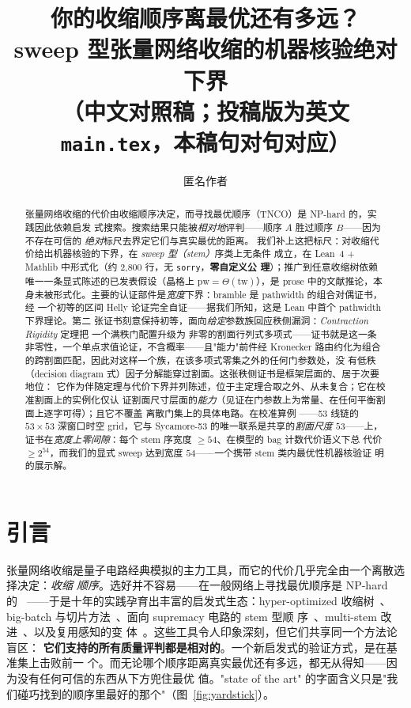 \documentclass[11pt]{ctexart}
\title{你的收缩顺序离最优还有多远？\\
       \large sweep 型张量网络收缩的机器核验绝对下界\\[2pt]
       \normalsize （中文对照稿；投稿版为英文 \texttt{main.tex}，本稿句对句对应）}
\author{匿名作者}
\date{}
\newcommand{\pw}{\mathrm{pw}}
\newcommand{\tw}{\mathrm{tw}}
\begin{document}
\maketitle

\begin{abstract}
张量网络收缩的代价由收缩顺序决定，而寻找最优顺序（TNCO）是 NP-hard 的，实践因此依赖启发
式搜索。搜索结果只能被\emph{相对地}评判——顺序 $A$ 胜过顺序 $B$——因为不存在可信的
\emph{绝对}标尺去界定它们与真实最优的距离。
我们补上这把标尺：对收缩代价给出机器核验的下界，在 \emph{sweep 型（stem）}序类上无条件
成立，在 Lean~4 + Mathlib 中形式化（约 2{,}800 行，无 \texttt{sorry}，\textbf{零自定义公
理}）；推广到任意收缩树依赖唯一一条显式陈述的已发表假设（晶格上 $\pw=\Theta(\tw)$），是
prose 中的文献推论，本身未被形式化。主要的认证部件是\emph{宽度}下界：bramble 是
pathwidth 的组合对偶证书，经
一个初等的区间 Helly 论证完全自证——据我们所知，这是 Lean 中首个 pathwidth 下界理论。第二
张证书刻意保持初等，面向\emph{给定}参数族回应秩侧漏洞：\emph{Contraction Rigidity} 定理把
一个满秩门配置升级为
非零的割面行列式多项式——证书就是这一条非零性，一个单点求值论证，不含概率——且"能力"前件经
Kronecker 路由约化为组合的跨割面匹配，因此对这样一个族，在该多项式零集之外的任何门参数处，没
有低秩（decision diagram 式）因子分解能穿过割面。这张秩侧证书是框架层面的、居于次要地位：
它作为伴随定理与代价下界并列陈述，位于主定理合取之外、从未复合；它在校准割面上的实例化仅认
证割面尺寸层面的\emph{能力}（见证在门参数上为常量、在任何平衡割面上逐字可得）；且它不覆盖
离散门集上的具体电路。在校准算例
——53 线链的
$53\times53$ 深窗口时空 grid，它与
Sycamore-53 的唯一联系是共享的\emph{割面尺度} $53$——上，证书在\emph{宽度上零间隙}：每个
stem 序宽度 $\ge 54$、在模型的 bag 计数代价语义下总
代价 $\ge 2^{54}$，而我们的显式 sweep 达到宽度 $54$——一个携带 stem 类内最优性机器核验证
明的展示解。
\end{abstract}

\section{引言}\label{sec:intro}

张量网络收缩是量子电路经典模拟的主力工具，而它的代价几乎完全由一个离散选择决定：\emph{收缩
顺序}。选好并不容易——在一般网络上寻找最优顺序是 NP-hard 的~\cite{markov2008simulating}
——于是十年的实践孕育出丰富的启发式生态：hyper-optimized 收缩树~\cite{gray2021hyper}、
big-batch 与切片方法~\cite{pan2022solving}、面向 supremacy 电路的 stem 型顺
序~\cite{huang2020classical}、multi-stem 改进~\cite{swtnc2025}、以及复用感知的变
体~\cite{kalachev2021recursive}。这些工具令人印象深刻，但它们共享同一个方法论盲区：
\textbf{它们支持的所有质量评判都是相对的}。一个新启发式的验证方式，是在基准集上击败前一
个。而无论哪个顺序距离真实最优还有多远，都无从得知——因为没有任何可信的东西从下方兜住最优
值。"state of the art" 的字面含义只是"我们碰巧找到的顺序里最好的那个"（图~\ref{fig:yardstick}）。
\end{document}
